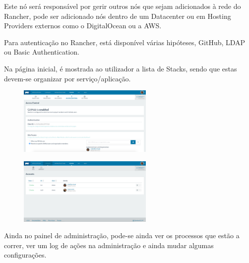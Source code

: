 \documentclass[pdftex,12pt,a4paper]{report}
\begin{document}
Este nó será responsável por gerir outros nós que sejam adicionados à rede do Rancher, pode ser adicionado nós dentro de um Datacenter ou em Hosting Providers externos como o DigitalOcean ou a AWS.

Para autenticação no Rancher, está disponível várias hipóteses, GitHub, LDAP ou Basic Authentication.

Na página inicial, é mostrada ao utilizador a lista de Stacks, sendo que estas devem-se organizar por serviço/aplicação.

\begin{figure}[!htb]
\centering
\begin{minipage}{.5\textwidth}
  \centering
  \includegraphics[width=65mm,scale=1]{imagens/access_control_github.png}
  \label{fig:access_control_github}
\end{minipage}%
\begin{minipage}{.5\textwidth}
  \centering
  \includegraphics[width=65mm,scale=1]{imagens/admin.png}
  \label{fig:admin}
\end{minipage}
\end{figure}

Ainda no painel de administração, pode-se ainda ver os processos que estão a correr, ver um log de ações na administração e ainda mudar algumas configurações.
\end{document}
